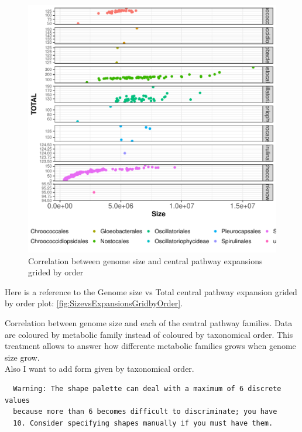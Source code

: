 \documentclass[12pt,twoside]{reedthesis}
\begin{document}
  \begin{figure}[h!tbp]
  \centering
  \includegraphics[angle = 0,scale = 1]{chapter5/SizevsExpansionsGridbyOrder.pdf}
  \caption[Correlation between genome size and central pathway expansions grided by order]{\normalsize{Correlation between genome size and central pathway expansions grided by order}}
  \label{fig:SizevsExpansionsGridbyOrder}
  \end{figure}
  
  Here is a reference to the Genome size vs Total central pathway
  expansion grided by order plot:
  \autoref{fig:SizevsExpansionsGridbyOrder}. \clearpage 
  
  Correlation between genome size and each of the central pathway
  families. Data are coloured by metabolic family instead of coloured by
  taxonomical order. This treatment allows to answer how differente
  metabolic families grows when genome size grow.\\
  Also I want to add form given by taxonomical order.
  
  \begin{verbatim}
  Warning: The shape palette can deal with a maximum of 6 discrete values
  because more than 6 becomes difficult to discriminate; you have
  10. Consider specifying shapes manually if you must have them.
  \end{verbatim}
  
\end{document}
